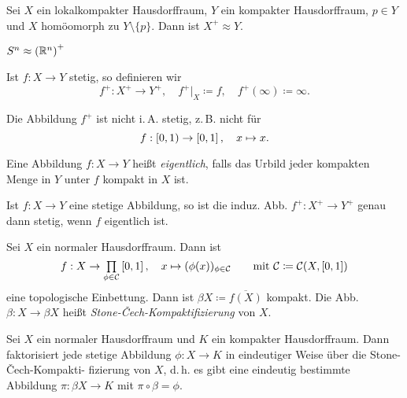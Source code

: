 \documentclass{cheat-sheet}
\begin{document}
\begin{prop}
  Sei $X$ ein lokalkompakter Hausdorffraum, $Y$ ein kompakter Hausdorffraum, $p \in Y$ und $X$ homöomorph zu $Y \setminus \{ p \}$. Dann ist $X^+ \approx Y$.
\end{prop}

\begin{kor}
  $S^n \approx \left(\mathbb{R}^n\right)^+$
\end{kor}

\begin{nota}
  Ist $f : X \to Y$ stetig, so definieren wir
  \[ f^+ : X^+ \to Y^+, \quad f^+|_X \coloneqq f, \quad f^+(\infty) \coloneqq \infty. \]
\end{nota}

\begin{bem}
  Die Abbildung $f^+$ ist nicht i.\,A. stetig, z.\,B. nicht für
  \[ f : \left[ 0, 1 \right) \to \left[ 0, 1 \right], \quad x \mapsto x. \]
\end{bem}

\begin{defn}
  Eine Abbildung $f : X \to Y$ heißt \emph{eigentlich}, falls das Urbild jeder kompakten Menge in $Y$ unter $f$ kompakt in $X$ ist.
\end{defn}

\begin{prop}
  Ist $f : X \to Y$ eine stetige Abbildung, so ist die induz. Abb. $f^+ : X^+ \to Y^+$ genau dann stetig, wenn $f$ eigentlich ist.
\end{prop}


\begin{defn}
  Sei $X$ ein normaler Hausdorffraum. Dann ist
  \[
    f : X \to \prod_{\phi \in \mathcal{C}} \I, \quad x \mapsto (\phi(x))_{\phi \in \mathcal{C}}
    \qquad \text{mit } \mathcal{C} \coloneqq \mathcal{C}(X, \I)
  \]
  eine topologische Einbettung. Dann ist $\beta X \coloneqq \overline{f(X)}$ kompakt. Die Abb. $\beta : X \to \beta X$ heißt \emph{Stone-Čech-Kompaktifizierung} von $X$.
\end{defn}

\begin{prop}
  Sei $X$ ein normaler Hausdorffraum und $K$ ein kompakter Hausdorffraum. Dann faktorisiert jede stetige Abbildung $\phi : X \to K$ in eindeutiger Weise über die Stone-Čech-Kompakti- fizierung von $X$, d.\,h. es gibt eine eindeutig bestimmte Abbildung $\pi : \beta X \to K$ mit $\pi \circ \beta = \phi$.
\end{prop}
\end{document}
